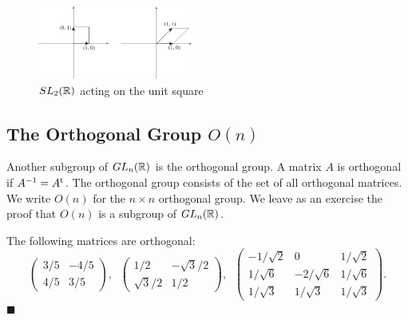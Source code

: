  
\begin{figure}[htb]
\begin{center}
\centerline {
\includegraphics[width=2in]{SL2}
}
\end{center}
\caption{$SL_2({\Bbb R})$ acting on the unit square}
\label{SL2}
\end{figure}
 
 
 
\subsection*{The Orthogonal Group $O(n)$}
 
 
 
Another subgroup of $GL_n({\Bbb R})$ is the orthogonal group. A matrix
$A$ is {\bfi
orthogonal\/} if
$A^{-1} = A^{\rm t}$. The {\bfi orthogonal
group\/} consists of
the set of all orthogonal matrices. We write
$O(n)$\label{noteorthogonal} for the $n \times n$ orthogonal group. We
leave as an exercise the proof that $O(n)$ is a subgroup of $GL_n(
{\Bbb R})$.
 
 
\vspace{1.5ex}
 
 
The following matrices are orthogonal:
\[
\left(
\begin{array}{cc}
3/5 & -4/5 \\
4/5 & 3/5
\end{array}
\right), \; \;
\left(
\begin{array}{cc}
1/2 & -\sqrt{3}/2 \\
\sqrt{3}/2 & 1/2
\end{array}
\right), \; \;
\left(
\begin{array}{ccc}
-1/\sqrt{2} & 0 & 1/ \sqrt{2} \\
1/\sqrt{6} & -2/\sqrt{6} & 1/\sqrt{6} \\
1/ \sqrt{3} & 1/ \sqrt{3} & 1/ \sqrt{3} 
\end{array}
\right).
\]
\hspace{\fill} $\blacksquare$
 
 
\vspace{1.5ex}
 
